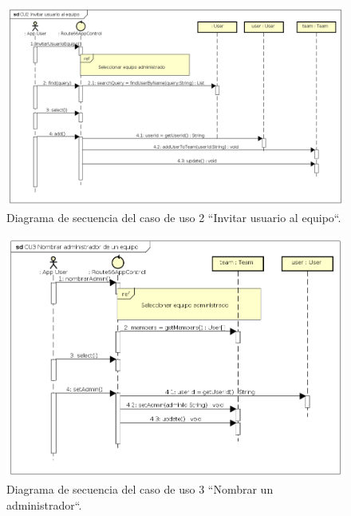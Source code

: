 \documentclass[twoside]{report}
\begin{document}
\begin{figure}[H]
\begin{center}
\includegraphics[scale=0.45]{images/sequence/CU2}
\caption{Diagrama de secuencia del caso de uso 2 “Invitar usuario al equipo“.}
\end{center}
\end{figure}

\begin{figure}[H]
\begin{center}
\includegraphics[scale=0.55]{images/sequence/CU3}
\caption{Diagrama de secuencia del caso de uso 3  “Nombrar un administrador“.}
\end{center}
\end{figure}
\end{document}

